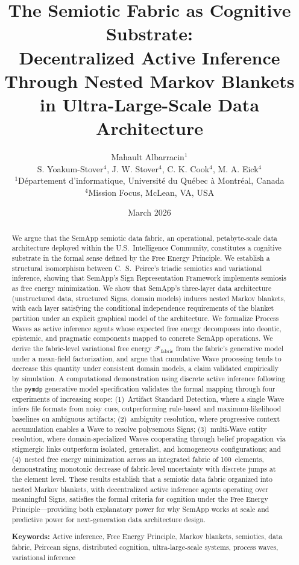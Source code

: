 \documentclass[11pt,a4paper]{article}
\title{
\textbf{The Semiotic Fabric as Cognitive Substrate:\\
Decentralized Active Inference Through Nested Markov Blankets\\
in Ultra-Large-Scale Data Architecture}
}
\author{
Mahault Albarracin$^{1}$ \\ [4pt]
S. Yoakum-Stover$^{4}$, J. W. Stover$^{4}$, C. K. Cook$^{4}$, M. A. Eick$^{4}$
\\[6pt]
\small $^{1}$D\'{e}partement d'informatique, Universit\'{e} du Qu\'{e}bec \`{a} Montr\'{e}al, Canada \\
\small $^{4}$Mission Focus, McLean, VA, USA \\
}
\date{March 2026}
\theoremstyle{definition}
\begin{document}
\maketitle

\begin{abstract}
We argue that the SemApp semiotic data fabric, an operational, petabyte-scale data architecture deployed within the U.S.\ Intelligence Community, constitutes a cognitive substrate in the formal sense defined by the Free Energy Principle.
We establish a structural isomorphism between C.~S.~Peirce's triadic semiotics and variational inference, showing that SemApp's Sign Representation Framework implements semiosis as free energy minimization.
We show that SemApp's three-layer data architecture (unstructured data, structured Signs, domain models) induces nested Markov blankets, with each layer satisfying the conditional independence requirements of the blanket partition under an explicit graphical model of the architecture.
We formalize Process Waves as active inference agents whose expected free energy decomposes into deontic, epistemic, and pragmatic components mapped to concrete SemApp operations.
We derive the fabric-level variational free energy $\mathcal{F}_{\text{fabric}}$ from the fabric's generative model under a mean-field factorization, and argue that cumulative Wave processing tends to decrease this quantity under consistent domain models, a claim validated empirically by simulation.
A computational demonstration using discrete active inference following the \texttt{pymdp} generative model specification \citep{heins2022pymdp} validates the formal mapping through four experiments of increasing scope: (1)~Artifact Standard Detection, where a single Wave infers file formats from noisy cues, outperforming rule-based and maximum-likelihood baselines on ambiguous artifacts; (2)~ambiguity resolution, where progressive context accumulation enables a Wave to resolve polysemous Signs; (3)~multi-Wave entity resolution, where domain-specialized Waves cooperating through belief propagation via stigmergic links outperform isolated, generalist, and homogeneous configurations; and (4)~nested free energy minimization across an integrated fabric of 100~elements, demonstrating monotonic decrease of fabric-level uncertainty with discrete jumps at the element level.
These results establish that a semiotic data fabric organized into nested Markov blankets, with decentralized active inference agents operating over meaningful Signs, satisfies the formal criteria for cognition under the Free Energy Principle---providing both explanatory power for why SemApp works at scale and predictive power for next-generation data architecture design.

\vspace{6pt}
\noindent\textbf{Keywords:} Active inference, Free Energy Principle, Markov blankets, semiotics, data fabric, Peircean signs, distributed cognition, ultra-large-scale systems, process waves, variational inference
\end{abstract}
\end{document}
